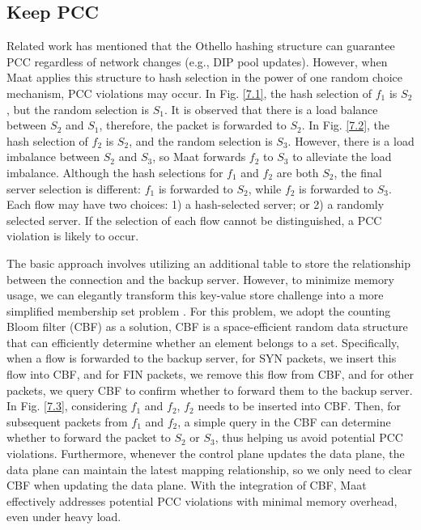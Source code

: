 {\subsection{Keep PCC}
Related work \cite{shi2020concury} has mentioned that the Othello hashing structure can guarantee PCC regardless of network changes (e.g., DIP pool updates). However, when Maat applies this structure to hash selection in the power of one random choice mechanism, PCC violations may occur. In Fig. \ref{7.1}, the hash selection of \emph{$f_1$} is \emph{$S_2$}, but the random selection is \emph{$S_1$}. It is observed that there is a load balance between \emph{$S_2$} and \emph{$S_1$}, therefore, the packet is forwarded to \emph{$S_2$}. In Fig. \ref{7.2}, the hash selection of \emph{$f_2$} is \emph{$S_2$}, and the random selection is \emph{$S_3$}. However, there is a load imbalance between \emph{$S_2$} and \emph{$S_3$}, so Maat forwards \emph{$f_2$} to \emph{$S_3$} to alleviate the load imbalance. Although the hash selections for \emph{$f_1$} and \emph{$f_2$} are both \emph{$S_2$}, the final server selection is different: \emph{$f_1$} is forwarded to \emph {$ S_2$}, while \emph{$f_2$} is forwarded to \emph{$S_3$}. Each flow may have two choices: 1) a hash-selected server; or 2) a randomly selected server. If the selection of each flow cannot be distinguished, a PCC violation is likely to occur.

The basic approach involves utilizing an additional table to store the relationship between the connection and the backup server. However, to minimize memory usage, we can elegantly transform this key-value store challenge into a more simplified membership set problem \cite{gandhi2014duet}. For this problem, we adopt the counting Bloom filter (CBF) as a solution, CBF is a space-efficient random data structure that can efficiently determine whether an element belongs to a set. Specifically, when a flow is forwarded to the backup server, for SYN packets, we insert this flow into CBF, and for FIN packets, we remove this flow from CBF, and for other packets, we query CBF to confirm whether to forward them to the backup server. In Fig. \ref{7.3}, considering \emph{$f_1$} and \emph{$f_2$}, \emph{$f_2$} needs to be inserted into CBF. Then, for subsequent packets from \emph{$f_1$} and \emph{$f_2$}, a simple query in the CBF can determine whether to forward the packet to \emph{$S_2$} or \emph{$S_3$}, thus helping us avoid potential PCC violations. Furthermore, whenever the control plane updates the data plane, the data plane can maintain the latest mapping relationship, so we only need to clear CBF when updating the data plane. With the integration of CBF, Maat effectively addresses potential PCC violations with minimal memory overhead, even under heavy load.

}
